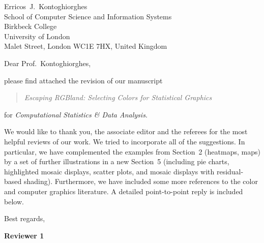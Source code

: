 \documentclass{wuletter}
\begin{document}
\begin{letter}{
Erricos~J.~Kontoghiorghes\\
School of Computer Science and Information Systems\\
Birkbeck College\\
University of London\\
Malet Street, London WC1E 7HX, United Kingdom}


\opening{Dear Prof.~Kontoghiorghes,}

please find attached the revision of our manuscript
\begin{quote}
\textit{Escaping RGBland: Selecting Colors for Statistical Graphics}
\end{quote}
for \emph{Computational Statistics \& Data Analysis}. 

We would like to thank you, the associate editor and the referees
for the most helpful reviews of our work. We tried to incorporate
all of the suggestions. In particular, we have complemented the
examples from Section~2 (heatmaps, maps) by a set of further illustrations
in a new Section~5 (including pie charts, highlighted mosaic displays,
scatter plots, and mosaic displays with residual-based shading).
Furthermore, we have included some more references to the color and
computer graphics literature. A detailed point-to-point reply is
included below.

\closing{Best regards,}
\end{letter}

\newpage

\textbf{Reviewer 1}
\end{document}
